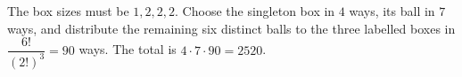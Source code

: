 The box sizes must be $1,2,2,2$. Choose the singleton box in $4$ ways, its ball in $7$ ways, and distribute the remaining six distinct balls to the three labelled boxes in $\dfrac{6!}{(2!)^3}=90$ ways. The total is $4\cdot7\cdot90=\boxed{2520}$.
